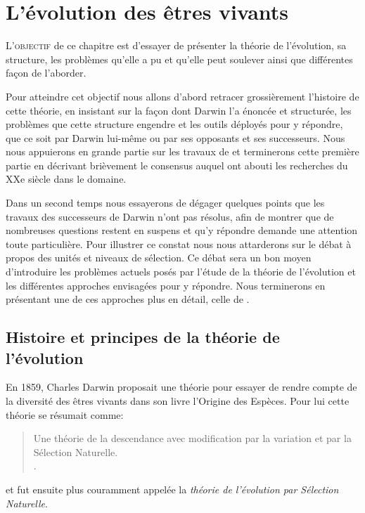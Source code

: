 

\chapter{L'évolution des êtres vivants}\label{ch:evolnat}

\lettrine[lines=2]{L}{'objectif} de ce chapitre est d'essayer de présenter la théorie de l'évolution, sa structure, les problèmes qu'elle a pu et qu'elle peut soulever ainsi que différentes façon de l'aborder.

Pour atteindre cet objectif nous allons d'abord retracer grossièrement l'histoire de cette théorie, en insistant sur la façon dont Darwin l'a énoncée et structurée, les problèmes que cette structure engendre et les outils déployés pour y répondre, que ce soit par Darwin lui-même ou par ses opposants et ses successeurs. Nous nous appuierons en grande partie sur les travaux de \cite{gayon1991darwinetlapresdarwin} et terminerons cette première partie en décrivant brièvement le consensus auquel ont abouti les recherches du XXe siècle dans le domaine. 

Dans un second temps nous essayerons de dégager quelques points que les travaux des successeurs de Darwin n'ont pas résolus, afin de montrer que de nombreuses questions restent en suspens et qu'y répondre demande une attention toute particulière. Pour illustrer ce constat nous nous attarderons sur le débat à propos des unités et niveaux de sélection. Ce débat sera un bon moyen d'introduire les problèmes actuels posés par l'étude de la théorie de l'évolution et les différentes approches envisagées pour y répondre. Nous terminerons en présentant une de ces approches plus en détail, celle de \cite{godfrey2009darwinian}.

\section{Histoire et principes de la théorie de l'évolution}\label{sec:cmpdr}

En 1859, Charles Darwin proposait une théorie pour essayer de rendre compte de la diversité des êtres vivants dans son livre l'Origine des Espèces\nocite{darwin1859originspeciesbymeansnaturalselectionorpreservationfavouredracesstrugglelife}. Pour lui cette théorie se résumait comme:
\begin{quote}
	Une théorie de la descendance avec modification par la variation et par la Sélection Naturelle.\\
	\citep[dernière édition, trad. \cite{gayon1991darwinetlapresdarwin}]{darwin1859originspeciesbymeansnaturalselectionorpreservationfavouredracesstrugglelife}.
\end{quote}
et fut ensuite plus couramment appelée la \emph{théorie de l'évolution par Sélection Naturelle}.

